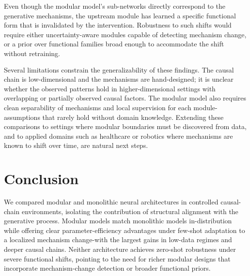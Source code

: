 \documentclass{article}
\begin{document}
Even though the modular model's sub-networks directly correspond to the generative
mechanisms, the upstream module has learned a specific functional form that is
invalidated by the intervention. Robustness to such shifts would require either
uncertainty-aware modules capable of detecting mechanism change, or a prior over
functional families broad enough to accommodate the shift without retraining.

Several limitations constrain the generalizability of these findings. The causal
chain is low-dimensional and the mechanisms are hand-designed; it is unclear whether
the observed patterns hold in higher-dimensional settings with overlapping or
partially observed causal factors. The modular model also requires clean
separability of mechanisms and local supervision for each module-assumptions that
rarely hold without domain knowledge. Extending these comparisons to settings where
modular boundaries must be discovered from data, and to applied domains such as
healthcare or robotics where mechanisms are known to shift over time, are natural
next steps.


\section{Conclusion}
\label{sec:conclusion}

We compared modular and monolithic neural architectures in controlled causal-chain
environments, isolating the contribution of structural alignment with the generative
process. Modular models match monolithic models in-distribution while offering
clear parameter-efficiency advantages under few-shot adaptation to a localized
mechanism change-with the largest gains in low-data regimes and deeper causal
chains. Neither architecture achieves zero-shot robustness under severe functional
shifts, pointing to the need for richer modular designs that incorporate
mechanism-change detection or broader functional priors.


% 
%


\end{document}
